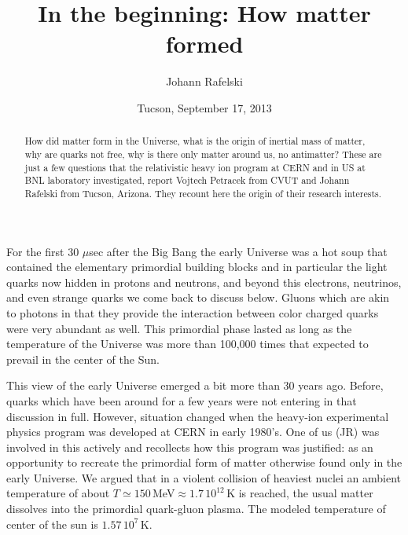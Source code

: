 \documentclass[twocolumn,showdate,prd,aps]{revtex4}
\begin{document}
\title{In the beginning: How matter formed}
\author{Johann Rafelski}
\date{Tucson, September 17, 2013}

\begin{abstract}
How did matter form in the Universe, what is the origin of inertial mass of matter, why are quarks not free,  why is there only matter around us, no antimatter? These are just a few questions that the relativistic heavy ion program at CERN and in US at BNL laboratory investigated, report Vojtech Petracek from CVUT and Johann Rafelski from Tucson, Arizona. They recount here the origin of their research interests. 
\end{abstract}
\vspace{0.8cm}
 
\maketitle

For the first 30 $\mu$sec after the Big Bang the early Universe  was a hot soup that contained  the elementary primordial building blocks and in particular the light  quarks now hidden in protons and neutrons, and beyond this electrons, neutrinos,  and even strange quarks we come back to discuss below. Gluons which are akin to photons in that they provide the interaction between color charged quarks were very abundant as well. This primordial phase lasted as long as the temperature of the Universe was more than 100,000 times that expected to prevail in the center of the Sun. 


This view of the early Universe emerged a bit more than 30 years ago. Before, quarks which have been around for a few years were not entering in that discussion in full. However, situation changed when the heavy-ion experimental physics program was developed at CERN in early 1980's.  One of us (JR) was involved in this actively and recollects how this program was justified: as an  opportunity to recreate the primordial form of matter otherwise found only in the early Universe. We argued that in a violent collision of heaviest nuclei an ambient temperature of about  $T\simeq 150$\,MeV$\approx 1.7\, 10^{12}$\,K is reached, the usual matter dissolves into the primordial quark-gluon plasma. The modeled temperature of center of the sun is $1.57 \, 10^{7}$\,K.
\end{document}
